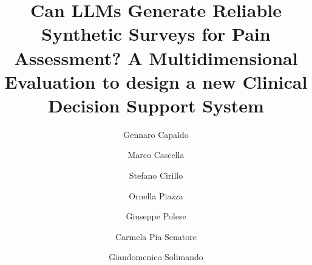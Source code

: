 \documentclass[preprint,12pt,authoryear]{elsarticle}
\begin{document}
\begin{frontmatter}



\title{Can LLMs Generate Reliable Synthetic Surveys for Pain Assessment? A Multidimensional Evaluation to design a new Clinical Decision Support System}


\author[inst1]{Gennaro Capaldo}
\author[inst2]{Marco Cascella}
\author[inst1]{Stefano Cirillo}
\author[inst2]{Ornella Piazza}
\author[inst1]{Giuseppe Polese}
\author[inst1]{Carmela Pia Senatore}
\ead{}
\author[inst1]{Giandomenico Solimando}

\address[inst1]{{Department of Computer Science, University of Salerno},%
  {Fisciano},
  {Salerno},
  {Italy}}

\address[inst2]{{Department of Medicine, Surgery, and Dentistry},
  {Salerno},
  {Italy}}


\end{frontmatter}
\end{document}
